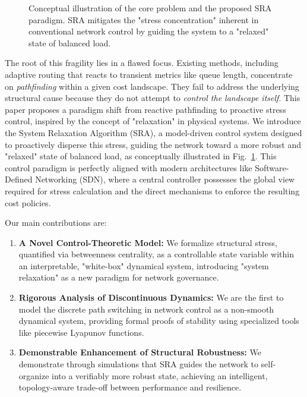 \documentclass[journal]{IEEEtran}
\begin{document}
\begin{figure}[t!]
    \caption{Conceptual illustration of the core problem and the proposed SRA paradigm. SRA mitigates the "stress concentration" inherent in conventional network control by guiding the system to a "relaxed" state of balanced load.}
    \vspace{-4mm}
    \label{fig:intro_scenario}
\end{figure}

The root of this fragility lies in a flawed focus. Existing methods, including adaptive routing that reacts to transient metrics like queue length, concentrate on \textit{pathfinding} within a given cost landscape. They fail to address the underlying structural cause because they do not attempt to \textit{control the landscape itself}. This paper proposes a paradigm shift from reactive pathfinding to proactive stress control, inspired by the concept of "relaxation" in physical systems. We introduce the System Relaxation Algorithm (SRA), a model-driven control system designed to proactively disperse this stress, guiding the network toward a more robust and "relaxed" state of balanced load, as conceptually illustrated in Fig.~\ref{fig:intro_scenario}. This control paradigm is perfectly aligned with modern architectures like Software-Defined Networking (SDN), where a central controller possesses the global view required for stress calculation and the direct mechanisms to enforce the resulting cost policies.

Our main contributions are:
\begin{enumerate}
    \item \textbf{A Novel Control-Theoretic Model:} We formalize structural stress, quantified via betweenness centrality, as a controllable state variable within an interpretable, "white-box" dynamical system, introducing "system relaxation" as a new paradigm for network governance.
    \item \textbf{Rigorous Analysis of Discontinuous Dynamics:} We are the first to model the discrete path switching in network control as a non-smooth dynamical system, providing formal proofs of stability using specialized tools like piecewise Lyapunov functions.
    \item \textbf{Demonstrable Enhancement of Structural Robustness:} We demonstrate through simulations that SRA guides the network to self-organize into a verifiably more robust state, achieving an intelligent, topology-aware trade-off between performance and resilience.
\end{enumerate}
\end{document}
